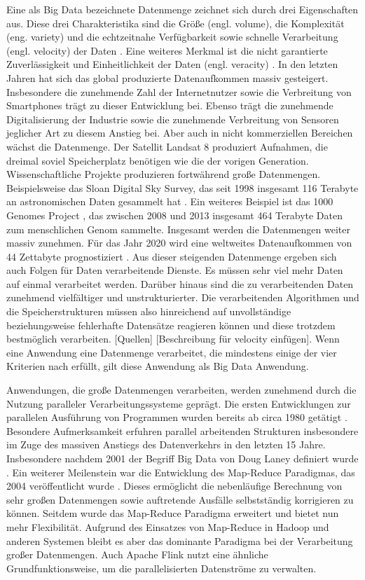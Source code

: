 Eine als Big Data bezeichnete Datenmenge zeichnet sich durch drei Eigenschaften aus. Diese drei Charakteristika sind die Größe (engl. volume), die Komplexität (eng. variety) und die echtzeitnahe Verfügbarkeit sowie schnelle Verarbeitung (engl. velocity) der Daten \cite{Laney2001}. Eine weiteres Merkmal ist die nicht garantierte Zuverlässigkeit und Einheitlichkeit der Daten (engl. veracity) \cite{Zikopoulos2012}. 
In den letzten Jahren hat sich das global produzierte Datenaufkommen massiv gesteigert. Insbesondere die zunehmende Zahl der Internetnutzer sowie die Verbreitung von Smartphones trägt zu dieser Entwicklung bei. Ebenso trägt die zunehmende Digitalisierung der Industrie sowie die zunehmende Verbreitung von Sensoren jeglicher Art zu diesem Anstieg bei. Aber auch in nicht kommerziellen Bereichen wächst die Datenmenge. Der Satellit Landsat 8 produziert Aufnahmen, die dreimal soviel Speicherplatz benötigen wie die der vorigen Generation. Wissenschaftliche Projekte produzieren fortwährend große Datenmengen. Beispielsweise das Sloan Digital Sky Survey, das seit 1998 insgesamt 116 Terabyte an astronomischen Daten gesammelt hat \cite{York2000, Alam2015}. Ein weiteres Beispiel ist das 1000 Genomes Project \cite{Baker2010}, das zwischen 2008 und 2013 insgesamt 464 Terabyte Daten zum menschlichen Genom sammelte. Insgesamt werden die Datenmengen weiter massiv zunehmen. Für das Jahr 2020 wird eine weltweites Datenaufkommen von 44 Zettabyte prognostiziert \cite{EMC2014}. Aus dieser steigenden Datenmenge ergeben sich auch Folgen für Daten verarbeitende Dienste. Es müssen sehr viel mehr Daten auf einmal verarbeitet werden. Darüber hinaus sind die zu verarbeitenden Daten zunehmend vielfältiger und unstrukturierter. Die verarbeitenden Algorithmen und die Speicherstrukturen müssen also hinreichend auf unvollständige beziehungsweise fehlerhafte Datensätze reagieren können und diese trotzdem bestmöglich verarbeiten. [Quellen] [Beschreibung für velocity einfügen].
Wenn eine Anwendung eine Datenmenge verarbeitet, die mindestens einige der vier Kriterien nach \cite{Laney2001} erfüllt, gilt diese Anwendung als Big Data Anwendung. 

Anwendungen, die große Datenmengen verarbeiten, werden zunehmend durch die Nutzung paralleler Verarbeitungssysteme geprägt. Die ersten Entwicklungen zur parallelen Ausführung von Programmen wurden bereits ab circa 1980 getätigt \cite{Borodin1985}. Besondere Aufmerksamkeit erfuhren parallel arbeitenden Strukturen insbesondere im Zuge des massiven Anstiegs des Datenverkehrs in den letzten 15 Jahre. Insbesondere nachdem 2001 der Begriff Big Data von Doug Laney definiert wurde \cite{Laney2001}. Ein weiterer Meilenstein war die Entwicklung des Map-Reduce Paradigmas, das 2004 veröffentlicht wurde \cite{Dean2004}. Dieses ermöglicht die nebenläufige Berechnung von sehr großen Datenmengen sowie auftretende Ausfälle selbstständig korrigieren zu können. Seitdem wurde das Map-Reduce Paradigma erweitert und bietet nun mehr Flexibilität. Aufgrund des Einsatzes von Map-Reduce in Hadoop und anderen Systemen bleibt es aber das dominante Paradigma bei der Verarbeitung großer Datenmengen. Auch Apache Flink nutzt eine ähnliche Grundfunktionsweise, um die parallelisierten Datenströme zu verwalten. 

